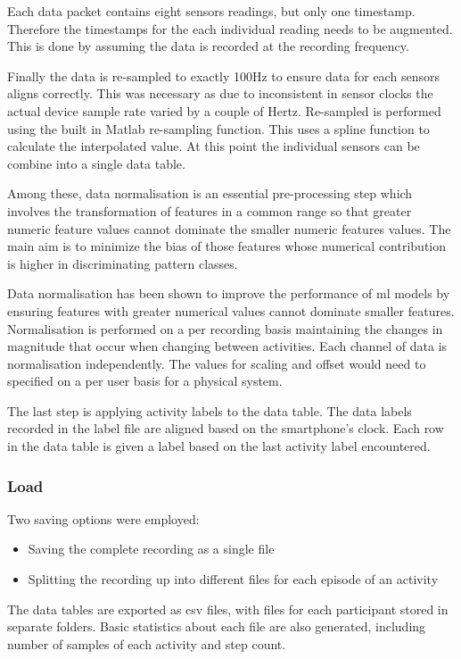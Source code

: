 Each data packet contains eight sensors readings, but only one timestamp. Therefore the timestamps for the each individual reading needs to be augmented. This is done by assuming the data is recorded at the recording frequency.

Finally the data is re-sampled to exactly 100Hz to ensure data for each sensors aligns correctly. This was necessary as due to inconsistent in sensor clocks the actual device sample rate varied by a couple of Hertz. Re-sampled is performed using the built in Matlab re-sampling function. This uses a spline function to calculate the interpolated value. At this point the individual sensors can be combine into a single data table.

Among these, data normalisation is an essential pre-processing step which involves the transformation of features in a common
range so that greater numeric feature values cannot dominate the smaller numeric features values. The main aim is to minimize the bias of those features whose numerical contribution is higher in discriminating pattern classes.

Data normalisation has been shown to improve the performance of \acrshort{ml} models by ensuring features with greater numerical values cannot dominate smaller features\cite{Singh2020}. Normalisation is performed on a per recording basis maintaining the changes in magnitude that occur when changing between activities. Each channel of data is normalisation independently. The values for scaling and offset would need to specified on a per user basis for a physical system.

The last step is applying activity labels to the data table. The data labels recorded in the label file are aligned based on the smartphone's clock. Each row in the data table is given a label based on the last activity label encountered.

\subsubsection{Load}
Two saving options were employed:
\begin{itemize}
    \item Saving the complete recording as a single file
    \item Splitting the recording up into different files for each episode of an activity
\end{itemize}

The data tables are exported as \acrfull{csv} files, with files for each participant stored in separate folders. Basic statistics about each file are also generated, including number of samples of each activity and step count.

